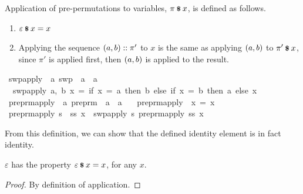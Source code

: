 \begin{definition}
Application of pre-permutations to variables, \(\pi \mathbin{\textrm{\footnotesize{\textbf{\$}}}} x\), is defined as follows.
\begin{enumerate}
\item
\(\varepsilon \mathbin{\textrm{\footnotesize{\textbf{\$}}}} x = x\)
\item
Applying the sequence \(\left(a, b\right) :: \pi'\) to \(x\) is the same as applying \(\left(a, b\right)\) to \(\pi' \mathbin{\textrm{\footnotesize{\textbf{\$}}}} x\), since \(\pi'\) is applied first, then \(\left(a, b\right)\) is applied to the result.
\end{enumerate}
\end{definition}

\begin{implementation}
\isamarkupfalse%
\ swp{\isacharunderscore}apply\ {\isacharcolon}{\isacharcolon}\ {\isachardoublequoteopen}{\isacharprime}a\ swp\ {\isasymRightarrow}\ {\isacharprime}a\ {\isasymRightarrow}\ {\isacharprime}a{\isachardoublequoteclose}\ \isanewline
\ \ {\isachardoublequoteopen}swp{\isacharunderscore}apply\ {\isacharparenleft}a,\ b{\isacharparenright}\ x\ =\ {\isacharparenleft}if\ x\ =\ a\ then\ b\ else\ {\isacharparenleft}if\ x\ =\ b\ then\ a\ else\ x{\isacharparenright}{\isacharparenright}{\isachardoublequoteclose}\isanewline
\isanewline
{}\isamarkupfalse%
\ preprm{\isacharunderscore}apply\ {\isacharcolon}{\isacharcolon}\ {\isachardoublequoteopen}{\isacharprime}a\ preprm\ {\isasymRightarrow}\ {\isacharprime}a\ {\isasymRightarrow}\ {\isacharprime}a{\isachardoublequoteclose}\ \isanewline
\ \ {\isachardoublequoteopen}preprm{\isacharunderscore}apply\ {\isacharbrackleft}{\isacharbrackright}\ x\ =\ x{\isachardoublequoteclose}\isanewline
{\isacharbar}\ {\isachardoublequoteopen}preprm{\isacharunderscore}apply\ {\isacharparenleft}s\ {\isacharhash}\ ss{\isacharparenright}\ x\ {\isacharequal}\ swp{\isacharunderscore}apply\ s\ {\isacharparenleft}preprm{\isacharunderscore}apply\ ss\ x{\isacharparenright}{\isachardoublequoteclose}\isanewline
\end{implementation}

From this definition, we can show that the defined identity element is in fact identity.

\begin{lemma}
\label{lemma:identity-application}
\(\varepsilon\) has the property \(\varepsilon \mathbin{\textrm{\footnotesize{\textbf{\$}}}} x = x\), for any \(x\).
\end{lemma}
\begin{proof}
By definition of application.
\end{proof}

